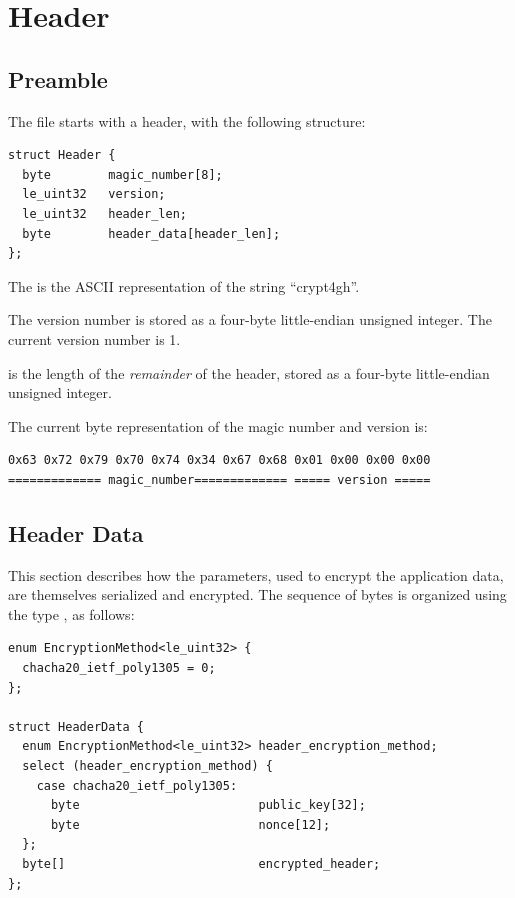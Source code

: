 \section{Header}\label{header}

\subsection{Preamble}\label{header:preamble}

The file starts with a header, with the following structure:

\begin{verbatim}
struct Header {
  byte        magic_number[8];
  le_uint32   version;
  le_uint32   header_len;
  byte        header_data[header_len];
};
\end{verbatim}

The  is the ASCII representation of the string ``crypt4gh''.

The version number is stored as a four-byte little-endian unsigned integer.
%
The current version number is 1.

 is the length of the \emph{remainder} of the header, stored as a four-byte little-endian unsigned integer.


The current byte representation of the magic number and version is:
\begin{verbatim}
0x63 0x72 0x79 0x70 0x74 0x34 0x67 0x68 0x01 0x00 0x00 0x00
============= magic_number============= ===== version =====
\end{verbatim}


\subsection{Header Data}\label{header:data}

This section describes how the parameters, used to encrypt the application data, are themselves serialized %
and encrypted.
%
The  sequence of bytes is organized using the type , as follows:

\begin{verbatim}
enum EncryptionMethod<le_uint32> {
  chacha20_ietf_poly1305 = 0;
};

struct HeaderData {
  enum EncryptionMethod<le_uint32> header_encryption_method;
  select (header_encryption_method) {
    case chacha20_ietf_poly1305:
      byte                         public_key[32];
      byte                         nonce[12];
  };
  byte[]                           encrypted_header;
};
\end{verbatim}

